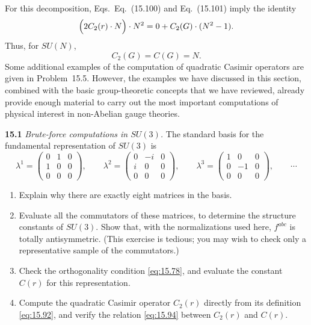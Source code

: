 For this decomposition, Eqs.~Eq.~(15.100) and Eq.~(15.101) imply
the identity
\begin{equation}
  \Bigl( 2C_2(r)\cdot N \Bigr) \cdot N^2 = 0 + C_2(G)\cdot(N^2-1) .
  \label{eq:15.103}
\end{equation}
Thus, for $SU(N)$,
\begin{equation}
  C_2(G) = C(G) = N .
  \label{eq:15.104}
\end{equation}
Some additional examples of the computation of quadratic Casimir operators
are given in Problem~15.5.  However, the examples we have discussed in this
section, combined with the basic group-theoretic concepts that we have
reviewed, already provide enough material to carry out the most important
computations of physical interest in non-Abelian gauge theories.

\problems

\textbf{15.1} \emph{Brute-force computations in $SU(3)$.}  The standard basis
for the fundamental representation of $SU(3)$ is
\begin{equation}
  \lambda^1 = \begin{pmatrix}0&1&0\\1&0&0\\0&0&0\end{pmatrix},\qquad
  \lambda^2 = \begin{pmatrix}0&-i&0\\i&0&0\\0&0&0\end{pmatrix},\qquad
  \lambda^3 = \begin{pmatrix}1&0&0\\0&-1&0\\0&0&0\end{pmatrix},\qquad
  \cdots
\end{equation}
\begin{enumerate}[label=(\alph*)]
  \item Explain why there are exactly eight matrices in the basis.
  \item Evaluate all the commutators of these matrices, to determine the
    structure constants of $SU(3)$.  Show that, with the normalizations used
    here, $f^{abc}$ is totally antisymmetric.  (This exercise is tedious; you
    may wish to check only a representative sample of the commutators.)
  \item Check the orthogonality condition \eqref{eq:15.78}, and evaluate the
    constant $C(r)$ for this representation.
  \item Compute the quadratic Casimir operator $C_2(r)$ directly from its
    definition \eqref{eq:15.92}, and verify the relation \eqref{eq:15.94}
    between $C_2(r)$ and $C(r)$.
\end{enumerate}

